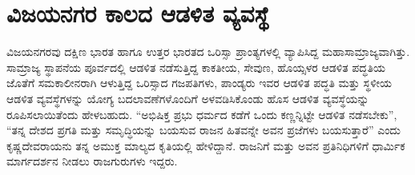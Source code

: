 \section*{ವಿಜಯನಗರ ಕಾಲದ ಆಡಳಿತ ವ್ಯವಸ್ಥೆ}

ವಿಜಯನಗರವು ದಕ್ಷಿಣ ಭಾರತ ಹಾಗೂ ಉತ್ತರ ಭಾರತದ ಒರಿಸ್ಸಾ ಪ್ರಾಂತ್ಯಗಳಲ್ಲಿ ವ್ಯಾಪಿಸಿದ್ದ ಮಹಾಸಾಮ್ರಾಜ್ಯವಾಗಿತ್ತು. ಸಾಮ್ರಾಜ್ಯ ಸ್ಥಾಪನೆಯ ಪೂರ್ವದಲ್ಲಿ ಆಡಳಿತ ನಡೆಸುತ್ತಿದ್ದ ಕಾಕತೀಯ, ಸೇವುಣ, ಹೊಯ್ಸಳರ ಆಡಳಿತ ಪದ್ಧತಿಯ ಜೊತೆಗೆ ಸಮಕಾಲೀನರಾಗಿ ಆಳುತ್ತಿದ್ದ ಒರಿಸ್ಸಾದ ಗಜಪತಿಗಳು, ಪಾಂಡ್ಯರು ಇವರ ಆಡಳಿತ ಪದ್ಧತಿ ಮತ್ತು ಸ್ಥಳೀಯ ಆಡಳಿತ ವ್ಯವಸ್ಥೆಗಳನ್ನು ಯೋಗ್ಯ ಬದಲಾವಣೆಗಳೊಂದಿಗೆ ಅಳವಡಿಸಿಕೊಂಡು ಹೊಸ ಆಡಳಿತ ವ್ಯವಸ್ಥೆಯನ್ನು ರೂಪಿಸಲಾಯಿತೆಂದು ಹೇಳಬಹುದು. “ಅಭಿಷಿಕ್ತ ಪ್ರಭು ಧರ್ಮದ ಕಡೆಗೆ ಒಂದು ಕಣ್ಣನ್ನಿಟ್ಟೇ ಆಡಳಿತ ನಡೆಸಬೇಕು”, “ತನ್ನ ದೇಶದ ಪ್ರಗತಿ ಮತ್ತು ಸಮೃದ್ಧಿಯನ್ನು ಬಯಸುವ ರಾಜನ ಹಿತವನ್ನೇ ಅವನ ಪ್ರಜೆಗಳು ಬಯಸುತ್ತಾರೆ” ಎಂದು ಕೃಷ್ಣದೇವರಾಯನು ತನ್ನ ಅಮುಕ್ತ ಮಾಲ್ಯದ ಕೃತಿಯಲ್ಲಿ ಹೇಳಿದ್ದಾನೆ. ರಾಜನಿಗೆ ಮತ್ತು ಅವನ ಪ್ರತಿನಿಧಿಗಳಿಗೆ ಧಾರ್ಮಿಕ ಮಾರ್ಗದರ್ಶನ ನೀಡಲು ರಾಜಗುರುಗಳು ಇದ್ದರು.

